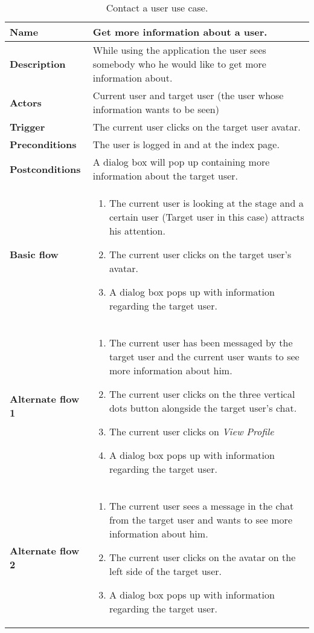 \begin{table}
	\centering
	\begin{tabular}{ | p{3.2cm} | p{11cm} | }
		\hline
		\textbf{Name} & Get more information about a user. \\
		\hline
		\textbf{Description} & While using the application the user sees somebody who he would like to get more information about. \\
		\hline
		\textbf{Actors} & Current user and target user (the user whose information wants to be seen)  \\
		\hline
		\textbf{Trigger} & The current user clicks on the target user avatar. \\
		\hline
		\textbf{Preconditions} & The user is logged in and at the index page. \\
		\hline
		\textbf{Postconditions} & A dialog box will pop up containing more information about the target user.\\
		\hline
		\textbf{Basic flow} & \begin{enumerate}[topsep=em,parsep=-.5em]
			\item The current user is looking at the stage and a certain user (Target user in this case) attracts his attention.
			\item The current user clicks on the target user's avatar.
			\item A dialog box pops up with information regarding the target user.
		\end{enumerate}} \\
		\hline
		\textbf{Alternate flow 1} & \begin{enumerate}[topsep=0em,parsep=-.5em]
			\item The current user has been messaged by the target user and the current user wants to see more information about him.
			\item The current user clicks on the three vertical dots button alongside the target user's chat.
			\item The current user clicks on \textit{View Profile}
			\item A dialog box pops up with information regarding the target user.
		\end{enumerate} \\
		\hline
		\textbf{Alternate flow 2} & \begin{enumerate}[topsep=0em,parsep=-.5em]
			\item The current user sees a message in the chat from the target user and wants to see more information about him.
			\item The current user clicks on the avatar on the left side of the target user.
			\item A dialog box pops up with information regarding the target user.
		\end{enumerate} \\
		\hline
	\end{tabular}	
	
	\caption{Contact a user use case.}
	\label{table:contact_user_use_case}
\end{table}
